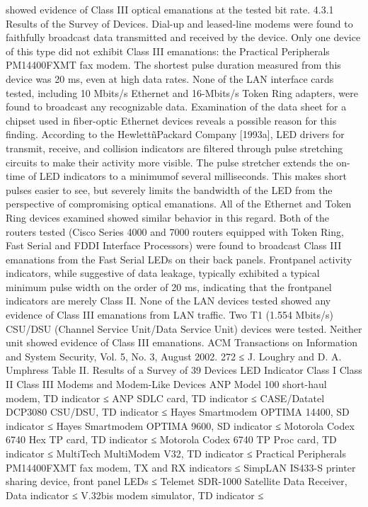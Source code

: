 showed evidence of Class III optical emanations at the tested bit rate. 
4.3.1 Results of the Survey of Devices. Dial-up and leased-line modems 
were found to faithfully broadcast data transmitted and received by the device. 
Only one device of this type did not exhibit Class III emanations: the Practical 
Peripherals PM14400FXMT fax modem. The shortest pulse duration measured 
from this device was 20 ms, even at high data rates. 
None of the LAN interface cards tested, including 10 Mbits/s Ethernet and 
16-Mbits/s Token Ring adapters, were found to broadcast any recognizable data. 
Examination of the data sheet for a chipset used in fiber-optic Ethernet devices 
reveals a possible reason for this finding. According to the HewlettñPackard 
Company [1993a], LED drivers for transmit, receive, and collision indicators 
are filtered through pulse stretching circuits to make their activity more 
visible. The pulse stretcher extends the on-time of LED indicators to a minimumof 
several milliseconds. This makes short pulses easier to see, but severely 
limits the bandwidth of the LED from the perspective of compromising optical 
emanations. All of the Ethernet and Token Ring devices examined showed similar 
behavior in this regard. 
Both of the routers tested (Cisco Series 4000 and 7000 routers equipped with 
Token Ring, Fast Serial and FDDI Interface Processors) were found to broadcast 
Class III emanations from the Fast Serial LEDs on their back panels. Frontpanel 
activity indicators, while suggestive of data leakage, typically exhibited 
a typical minimum pulse width on the order of 20 ms, indicating that the frontpanel 
indicators are merely Class II. None of the LAN devices tested showed 
any evidence of Class III emanations from LAN traffic. 
Two T1 (1.554 Mbits/s) CSU/DSU (Channel Service Unit/Data Service Unit) 
devices were tested. Neither unit showed evidence of Class III emanations. 
ACM Transactions on Information and System Security, Vol. 5, No. 3, August 2002.
272 ≤ J. Loughry and D. A. Umphress 
Table II. Results of a Survey of 39 Devices 
LED Indicator Class I Class II Class III 
Modems and Modem-Like Devices 
ANP Model 100 short-haul modem, TD indicator ≤ ANP SDLC card, TD indicator ≤ CASE/Datatel DCP3080 CSU/DSU, TD indicator ≤ Hayes Smartmodem OPTIMA 14400, SD indicator ≤ Hayes Smartmodem OPTIMA 9600, SD indicator ≤ Motorola Codex 6740 Hex TP card, TD indicator ≤ Motorola Codex 6740 TP Proc card, TD indicator ≤ MultiTech MultiModem V32, TD indicator ≤ Practical Peripherals PM14400FXMT fax modem, TX and 
RX indicators ≤ SimpLAN IS433-S printer sharing device, front panel LEDs ≤ Telemet SDR-1000 Satellite Data Receiver, Data indicator ≤ V.32bis modem simulator, TD indicator ≤ 
